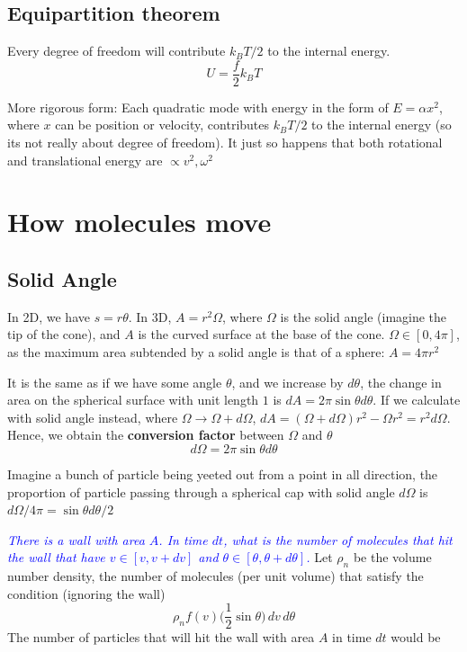 \subsection{Equipartition theorem}
Every degree of freedom will contribute $k_B T/2$ to the internal energy. 
\begin{equation}
    U=\frac{f}{2}k_BT
\end{equation}

More rigorous form: Each quadratic mode with energy in the form of $E=\alpha x^2$, where $x$ can be position or velocity, contributes $k_BT/2$ to the internal energy (so its not really about degree of freedom). It just so happens that both rotational and translational energy are $\propto v^2, \omega^2$

\section{How molecules move}
\subsection{Solid Angle}
In 2D, we have $s=r\theta$. In 3D, $A=r^2 \Omega$, where $\Omega$ is the solid angle (imagine the tip of the cone), and $A$ is the curved surface at the base of the cone. $\Omega \in [0,4\pi]$, as the maximum area subtended by a solid angle is that of a sphere: $A=4\pi r^2$

It is the same as if we have some angle $\theta$, and we increase by $d\theta$, the change in area on the spherical surface with unit length $1$ is $dA= 2\pi \sin \theta d\theta$. If we calculate with solid angle instead, where $\Omega \to \Omega + d\Omega$, $dA=(\Omega + d\Omega)r^2-\Omega r^2 = r^2 d \Omega$.
Hence, we obtain the \textbf{conversion factor} between $\Omega$ and $\theta$
\begin{equation}
    d\Omega=2\pi \sin \theta d\theta
\end{equation}

Imagine a bunch of particle being yeeted out from a point in all direction, the proportion of particle passing through a spherical cap with solid angle $d\Omega$ is $d\Omega/4\pi = \sin \theta d\theta/2$

\textcolor{blue}{\textit{There is a wall with area $A$. In time $dt$, what is the number of molecules that hit the wall that have $v \in [v,v+dv]$ and $\theta \in [\theta,\theta+d\theta]$.}}
Let $\rho_n$ be the volume number density, the number of molecules (per unit volume) that satisfy the condition (ignoring the wall)
\begin{equation}
    \rho_n f(v)\bigg(\frac{1}{2}\sin\theta\bigg)\,dv\,d\theta
\end{equation}
The number of particles that will hit the wall with area $A$ in time $dt$ would be 


